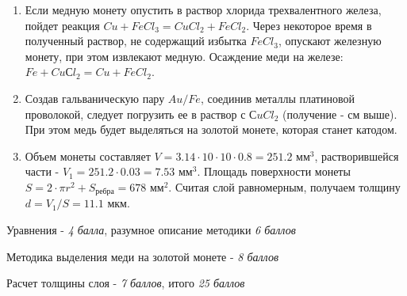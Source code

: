 \solutionSection

\begin{enumerate}
    \item Если медную монету опустить в раствор хлорида трехвалентного железа, пойдет реакция $Cu + FeCl_3 = CuCl_2 + FeCl_2$. 
    Через некоторое время в полученный раствор, не содержащий избытка $FeCl_3$, опускают железную монету, при 
    этом извлекают медную. Осаждение меди на железе: \linebreak $Fe + CuСl_2 = Cu + FeCl_2$.
    \item Создав гальваническую пару $Au/Fe$, соединив металлы платиновой проволокой, следует погрузить ее в 
    раствор с $СuCl_2$ (получение - см выше). При этом медь будет выделяться на золотой монете, которая станет катодом.
    \item Объем монеты составляет $V = 3.14 \cdot 10 \cdot 10 \cdot 0.8 = 251.2$ мм$^3$, растворившейся части - 
    $V_1 = 251.2 \cdot 0.03 = 7.53$ мм$^3$. Площадь поверхности монеты \linebreak $S = 2 \cdot \pi r^2 + S_{\text{ребра}}= 678$ мм$^2$. 
    Считая слой равномерным, получаем толщину $d = V_1/S = 11.1$ мкм.
\end{enumerate}

Уравнения - \textit{4 балла}, разумное описание методики \textit{6 баллов}

Методика выделения меди на золотой монете - \textit{8 баллов}

Расчет толщины слоя - \textit{7 баллов}, итого \textit{25 баллов}